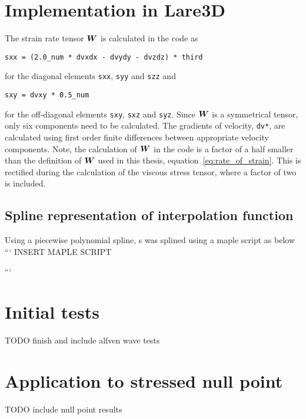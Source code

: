 \section{Implementation in Lare3D}

The strain rate tensor ${\bm W}$ is calculated in the code as
\begin{verbatim}
sxx = (2.0_num * dvxdx - dvydy - dvzdz) * third
\end{verbatim}
for the diagonal elements \verb|sxx|, \verb|syy| and \verb|szz| and
\begin{verbatim}
sxy = dvxy * 0.5_num
\end{verbatim}
for the off-diagonal elements \verb|sxy|, \verb|sxz| and \verb|syz|. Since ${\bm W}$ is a symmetrical tensor, only six components need to be calculated. The gradients of velocity, \verb|dv*|, are calculated using first order finite differences between appropriate velocity components. Note, the calculation of ${\bm W}$ in the code is a factor of a half smaller than the definition of ${\bm W}$ used in this thesis, equation~\ref{eq:rate_of_strain}. This is rectified during the calculation of the viscous stress tensor, where a factor of two is included.

\subsection{Spline representation of interpolation function}

Using a piecewise polynomial spline, s was splined using a maple script as below
```
INSERT MAPLE SCRIPT

```

\section{Initial tests}

TODO finish and include alfven wave tests

\section{Application to stressed null point}

TODO include null point results
